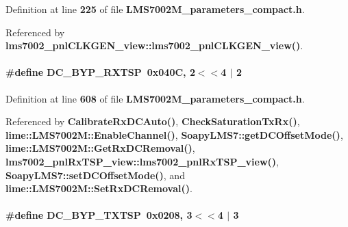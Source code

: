 Definition at line {\bf 225} of file {\bf L\+M\+S7002\+M\+\_\+parameters\+\_\+compact.\+h}.



Referenced by {\bf lms7002\+\_\+pnl\+C\+L\+K\+G\+E\+N\+\_\+view\+::lms7002\+\_\+pnl\+C\+L\+K\+G\+E\+N\+\_\+view()}.

\paragraph[{D\+C\+\_\+\+B\+Y\+P\+\_\+\+R\+X\+T\+SP}]{\setlength{\rightskip}{0pt plus 5cm}\#define D\+C\+\_\+\+B\+Y\+P\+\_\+\+R\+X\+T\+SP~0x040\+C, 2$<$$<$4 $\vert$  2}\label{LMS7002M__parameters__compact_8h_ad774e707742f99dab5c1932b1d85c724}


Definition at line {\bf 608} of file {\bf L\+M\+S7002\+M\+\_\+parameters\+\_\+compact.\+h}.



Referenced by {\bf Calibrate\+Rx\+D\+C\+Auto()}, {\bf Check\+Saturation\+Tx\+Rx()}, {\bf lime\+::\+L\+M\+S7002\+M\+::\+Enable\+Channel()}, {\bf Soapy\+L\+M\+S7\+::get\+D\+C\+Offset\+Mode()}, {\bf lime\+::\+L\+M\+S7002\+M\+::\+Get\+Rx\+D\+C\+Removal()}, {\bf lms7002\+\_\+pnl\+Rx\+T\+S\+P\+\_\+view\+::lms7002\+\_\+pnl\+Rx\+T\+S\+P\+\_\+view()}, {\bf Soapy\+L\+M\+S7\+::set\+D\+C\+Offset\+Mode()}, and {\bf lime\+::\+L\+M\+S7002\+M\+::\+Set\+Rx\+D\+C\+Removal()}.

\paragraph[{D\+C\+\_\+\+B\+Y\+P\+\_\+\+T\+X\+T\+SP}]{\setlength{\rightskip}{0pt plus 5cm}\#define D\+C\+\_\+\+B\+Y\+P\+\_\+\+T\+X\+T\+SP~0x0208, 3$<$$<$4 $\vert$  3}\label{LMS7002M__parameters__compact_8h_a4f9b191195d122e3e919b0c47cb39b3d}



